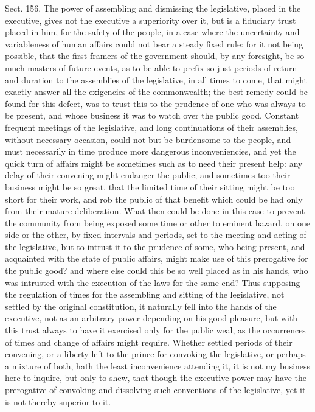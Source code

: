 \documentclass[11pt,openany]{book}
\begin{document}
Sect. 156. The power of assembling and dismissing the legislative, placed in the executive, gives not the executive a superiority over it, but is a fiduciary trust placed in him, for the safety of the people, in a case where the uncertainty and variableness of human affairs could not bear a steady fixed rule: for it not being possible, that the first framers of the government should, by any foresight, be so much masters of future events, as to be able to prefix so just periods of return and duration to the assemblies of the legislative, in all times to come, that might exactly answer all the exigencies of the commonwealth; the best remedy could be found for this defect, was to trust this to the prudence of one who was always to be present, and whose business it was to watch over the public good. Constant frequent meetings of the legislative, and long continuations of their assemblies, without necessary occasion, could not but be burdensome to the people, and must necessarily in time produce more dangerous inconveniencies, and yet the quick turn of affairs might be sometimes such as to need their present help: any delay of their convening might endanger the public; and sometimes too their business might be so great, that the limited time of their sitting might be too short for their work, and rob the public of that benefit which could be had only from their mature deliberation. What then could be done in this case to prevent the community from being exposed some time or other to eminent hazard, on one side or the other, by fixed intervals and periods, set to the meeting and acting of the legislative, but to intrust it to the prudence of some, who being present, and acquainted with the state of public affairs, might make use of this prerogative for the public good? and where else could this be so well placed as in his hands, who was intrusted with the execution of the laws for the same end? Thus supposing the regulation of times for the assembling and sitting of the legislative, not settled by the original constitution, it naturally fell into the hands of the executive, not as an arbitrary power depending on his good pleasure, but with this trust always to have it exercised only for the public weal, as the occurrences of times and change of affairs might require. Whether settled periods of their convening, or a liberty left to the prince for convoking the legislative, or perhaps a mixture of both, hath the least inconvenience attending it, it is not my business here to inquire, but only to shew, that though the executive power may have the prerogative of convoking and dissolving such conventions of the legislative, yet it is not thereby superior to it.
\end{document}
